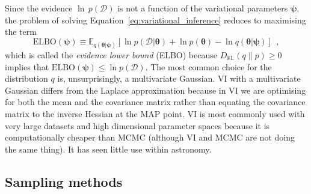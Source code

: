 \documentclass[12pt,dvipsnames]{report}
\renewcommand{\vec}[1]{\boldsymbol{\mathbf{#1}}}
\newcommand{\hquad}{~~}
\begin{document}
Since the evidence $\ln\,p(\mathcal{D})$ is not a function of the variational parameters
$\vec{\psi}$, the problem of solving Equation~\ref{eq:variational_inference} reduces
to maximising the term
\begin{equation}
    \mathrm{ELBO}(\boldsymbol{\psi}) \equiv \mathbb{E}_{q(\boldsymbol{\theta} \lvert\boldsymbol{\psi})}[\ln p(\mathcal{D} \lvert\boldsymbol{\theta})+\ln p(\boldsymbol{\theta})-\ln q(\boldsymbol{\theta} \lvert\boldsymbol{\psi})]
    \hquad,
\end{equation}
which is called the \emph{evidence lower bound} (ELBO) because
$D_{\mathbb{K} \mathbb{L}}(q \| p) \geq 0$ implies that
$\mathrm{ELBO}(\boldsymbol{\psi}) \leq \ln p(\mathcal{D})$.
The most common choice for the distribution $q$ is, unsurprisingly, a multivariate
Gaussian. VI with a multivariate Gaussian differs from  the Laplace approximation
because  in VI we are optimising for both the mean and the covariance matrix rather
than equating the covariance matrix to the inverse Hessian at the MAP point.
VI is most commonly used with very large datasets and high dimensional parameter
spaces because it is computationally cheaper than MCMC (although VI and MCMC are not
doing the same thing). It has seen little use within astronomy.

\subsection{Sampling methods}
\label{ssec:sampling_methods}
\end{document}
